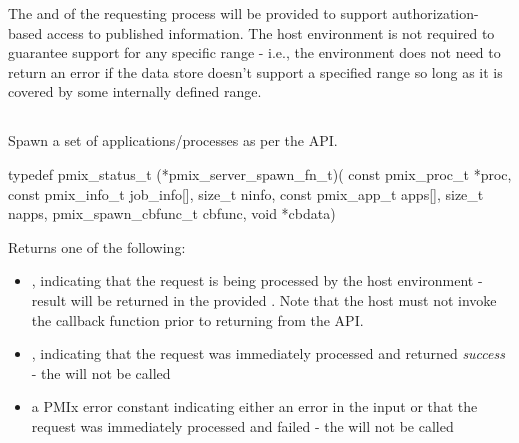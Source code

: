 \advicermstart
The  and  of the requesting process will be provided to support authorization-based access to published information. The host environment is not required to guarantee support for any specific range - i.e., the environment does not need to return an error if the data store doesn't support a specified range so long as it is covered by some internally defined range.
\advicermend


\subsection{}

\summary

Spawn a set of applications/processes as per the  API.

\format

\cspecificstart
\begin{codepar}
typedef pmix_status_t (*pmix_server_spawn_fn_t)(
                             const pmix_proc_t *proc,
                             const pmix_info_t job_info[],
                             size_t ninfo,
                             const pmix_app_t apps[],
                             size_t napps,
                             pmix_spawn_cbfunc_t cbfunc,
                             void *cbdata)
\end{codepar}
\cspecificend

\begin{arglist}
\end{arglist}

Returns one of the following:

\begin{itemize}
    \item {}, indicating that the request is being processed by the host environment - result will be returned in the provided . Note that the host must not invoke the callback function prior to returning from the \ac{API}.
    \item {}, indicating that the request was immediately processed and returned \textit{success} - the  will not be called
    \item a PMIx error constant indicating either an error in the input or that the request was immediately processed and failed - the  will not be called
\end{itemize}

